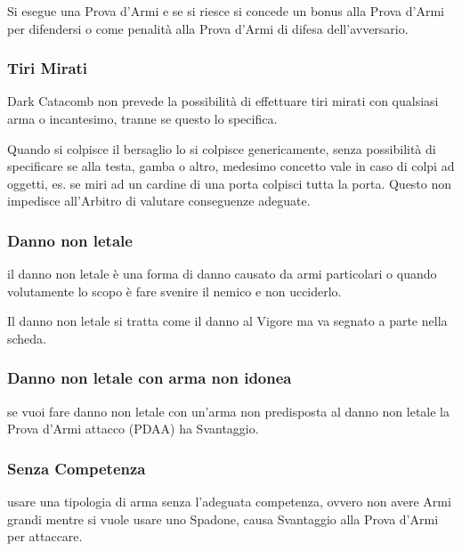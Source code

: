 \documentclass[12pt,a4paper,twoside,openany]{book}
\begin{document}
\begin{multicols}{2}
Si esegue una Prova d'Armi e se si riesce si concede un bonus alla Prova d'Armi per difendersi o come penalità alla Prova d'Armi di difesa dell'avversario.

\subsubsection{Tiri Mirati}\label{tirimirati}

Dark Catacomb non prevede la possibilità di effettuare tiri mirati con qualsiasi arma o incantesimo, tranne se questo lo specifica.

Quando si colpisce il bersaglio lo si colpisce genericamente, senza possibilità di specificare se alla testa, gamba o altro, medesimo concetto vale in caso di colpi ad oggetti, es. se miri ad un cardine di una porta colpisci tutta la porta. Questo non impedisce all'Arbitro di valutare conseguenze adeguate.

\subsubsection{Danno non letale}\label{dannononletale}

il danno non letale è una forma di danno causato da armi particolari o quando volutamente lo scopo è fare svenire il nemico e non ucciderlo.

Il danno non letale si tratta come il danno al Vigore ma va segnato a parte nella scheda.

\subsubsection{Danno non letale con arma non idonea} \label{dannononletalearmanonidonea}

se vuoi fare danno non letale con un'arma non predisposta al danno non letale la Prova d'Armi attacco (PDAA) ha Svantaggio.

\subsubsection{Senza Competenza}\label{senzacompetenza}

usare una tipologia di arma senza l'adeguata competenza, ovvero non avere Armi grandi mentre si vuole usare uno Spadone, causa Svantaggio alla Prova d'Armi per attaccare.


\end{multicols}
\end{document}
